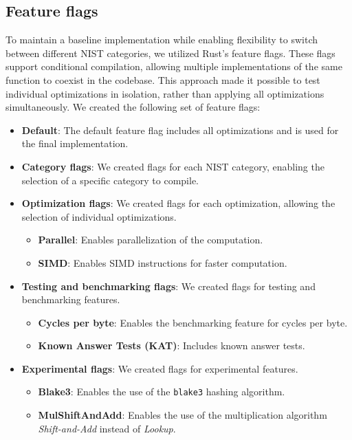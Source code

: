 \documentclass[11pt]{report}
\theoremstyle{definition}
\theoremstyle{plain}
\begin{document}
\subsection{Feature flags}\label{sub:feature_flags}
To maintain a baseline implementation while enabling flexibility to switch between different NIST categories, we utilized Rust's feature flags. These flags support conditional compilation, allowing multiple implementations of the same function to coexist in the codebase. This approach made it possible to test individual optimizations in isolation, rather than applying all optimizations simultaneously.
We created the following set of feature flags:
\begin{itemize}[parsep=0pt, itemsep=3pt]
  \item \textbf{Default}: The default feature flag includes all optimizations and is used for the final implementation.
  \item \textbf{Category flags}: We created flags for each NIST category, enabling the selection of a specific category to compile.
  \item \textbf{Optimization flags}: We created flags for each optimization, allowing the selection of individual optimizations.
        \begin{itemize}
          \item \textbf{Parallel}: Enables parallelization of the computation.
          \item \textbf{SIMD}: Enables SIMD instructions for faster computation.
        \end{itemize}
  \item \textbf{Testing and benchmarking flags}: We created flags for testing and benchmarking features.
        \begin{itemize}
          \item \textbf{Cycles per byte}: Enables the benchmarking feature for cycles per byte.
          \item \textbf{Known Answer Tests (KAT)}: Includes known answer tests.
        \end{itemize}
  \item \textbf{Experimental flags}: We created flags for experimental features.
        \begin{itemize}
          \item \textbf{Blake3}: Enables the use of the \texttt{blake3} hashing algorithm.
          \item \textbf{MulShiftAndAdd}: Enables the use of the multiplication algorithm \textit{Shift-and-Add} instead of \textit{Lookup}.
        \end{itemize}
\end{itemize}
\end{document}

